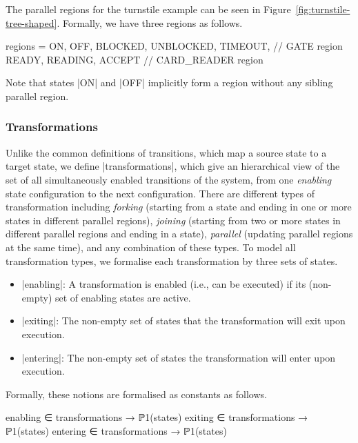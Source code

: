 \begin{example}
    The parallel regions for the turnstile example can be seen in Figure~\ref{fig:turnstile-tree-shaped}. Formally, we have three regions as follows.
\begin{EventBcode}
regions = { {ON, OFF},
	{BLOCKED, UNBLOCKED, TIMEOUT}, // GATE region
	{READY, READING, ACCEPT}	// CARD_READER region
}
\end{EventBcode}
Note that states |ON| and |OFF| implicitly form a region without any sibling parallel region.
\end{example}

\subsubsection{Transformations} Unlike the common definitions of transitions, which map a source state to a target state, we define |transformations|, which give an hierarchical view of the set of all simultaneously enabled transitions of the system, from one \emph{enabling} state configuration to the next configuration. 
There are different types of transformation including 
\emph{forking} (starting from a state and ending in one or more states in different parallel regions), 
\emph{joining} (starting from two or more states in different parallel regions and ending in a state), \emph{parallel} (updating parallel regions at the same time), 
and any combination of these types. 
To model all transformation types, we formalise each transformation by three sets of states.
\begin{itemize}
\item |enabling|: A transformation is enabled (i.e., can be executed)
  if its (non-empty) set of enabling states are active.
  
\item |exiting|: The non-empty set of states that the transformation
  will exit upon execution.
  
\item |entering|: The non-empty set of states the transformation will enter upon
  execution.
\end{itemize}
Formally, these notions are formalised as constants as follows.
\begin{EventBcode}
enabling ∈ transformations → ℙ1(states)
exiting ∈ transformations → ℙ1(states)
entering ∈ transformations → ℙ1(states)
\end{EventBcode}

